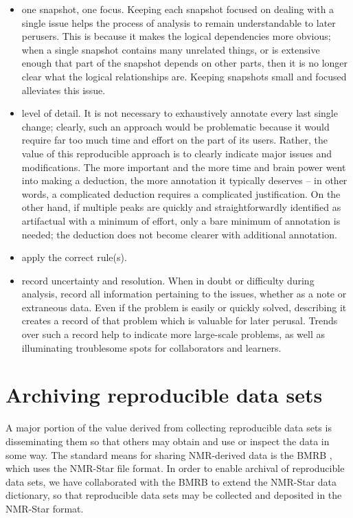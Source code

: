 \begin{itemize}
  \item one snapshot, one focus.  Keeping each snapshot focused on dealing
    with a single issue helps the process of analysis to remain understandable
    to later perusers.  This is because it makes the logical dependencies 
    more obvious; when a single snapshot contains many unrelated things, or
    is extensive enough that part of the snapshot depends on other parts, then
    it is no longer clear what the logical relationships are.  Keeping snapshots
    small and focused alleviates this issue.
  \item level of detail.  It is not necessary to exhaustively annotate every
    last single change; clearly, such an approach would be problematic because
    it would require far too much time and effort on the part of its users.
    Rather, the value of this reproducible approach is to clearly indicate 
    major issues and modifications.  The more important and the more time and
    brain power went into making a deduction, the more annotation it typically
    deserves -- in other words, a complicated deduction requires a complicated
    justification.  On the other hand, if multiple peaks are quickly and
    straightforwardly identified as artifactual with a minimum of effort, 
    only a bare minimum of annotation is needed; the deduction does not become
    clearer with additional annotation.
  \item apply the correct rule(s).
  \item record uncertainty and resolution.  When in doubt or difficulty 
    during analysis, record all information pertaining to the issues, whether
    as a note or extraneous data.  Even if the problem is easily or quickly
    solved, describing it creates a record of that problem which is valuable
    for later perusal.  Trends over such a record help to indicate more 
    large-scale problems, as well as illuminating troublesome spots for
    collaborators and learners.
\end{itemize}
   


\section{Archiving reproducible data sets}
A major portion of the value derived from collecting reproducible data sets
is disseminating them so that others may obtain and use or inspect the data
in some way.  The standard means for sharing NMR-derived data is the BMRB
\cite{bmrb}, which uses the NMR-Star file format.  In order to enable archival
of reproducible data sets, we have collaborated with the BMRB to extend the
NMR-Star data dictionary, so that reproducible data sets may be collected and
deposited in the NMR-Star format.

